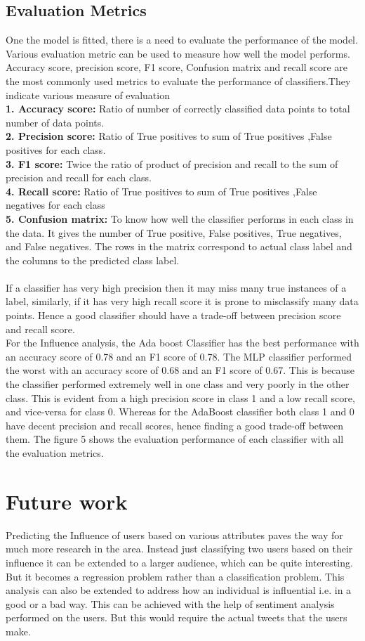 \documentclass[sigconf]{acmart}
\begin{document}
\subsection{Evaluation Metrics}
One the model is fitted, there is a need to evaluate the performance of the model. Various evaluation metric can be used to measure how well the model performs. Accuracy score, precision score, F1 score, Confusion matrix and recall score are the most commonly used metrics to evaluate the performance of classifiers.They indicate various measure of evaluation\\
\textbf{1. Accuracy score:} Ratio of number of correctly classified data points to total number of data points.\\
\textbf{2. Precision score:}  Ratio of True positives to sum of True positives ,False positives for each class.\\
\textbf{3. F1 score:} Twice the ratio of product of precision and recall to the sum of precision and recall for each class.\\
\textbf{4. Recall score:} Ratio of True positives to sum of True positives ,False negatives for each class\\
\textbf{5. Confusion matrix:} To know how well the classifier performs in each class in the data. It gives the number of True positive, False positives, True negatives, and False negatives. The rows in the matrix correspond to actual class label and the columns to the predicted class label.\\\\
If a classifier has very high precision then it may miss many true instances of a label, similarly, if it has very high recall score it is prone to misclassify many data points. Hence a good classifier should have a trade-off between precision score and recall score.\\
For the Influence analysis, the Ada boost Classifier has the best performance with an accuracy score of 0.78 and an F1 score of 0.78. The MLP classifier performed the worst with an accuracy score of 0.68 and an F1 score of 0.67. This is because the classifier performed extremely well in one class and very poorly in the other class. This is evident from a high precision score in class 1 and a low recall score, and vice-versa for class 0. Whereas for the AdaBoost classifier both class 1 and 0 have decent precision and recall scores, hence finding a good trade-off between them. The figure 5 shows the evaluation performance of each classifier with all the evaluation metrics.  
\section{Future work}
Predicting the Influence of users based on various attributes paves the way for much more research in the area. Instead just classifying two users based on their influence it can be extended to a larger audience, which can be quite interesting. But it becomes a regression problem rather than a classification problem. This analysis can also be extended to address how an individual is influential i.e. in a good or a bad way. This can be achieved with the help of sentiment analysis performed on the users. But this would require the actual tweets that the users make.
\end{document}
